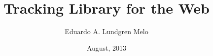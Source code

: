 \documentclass{ufpethesis}
\institute{Computer Science Center}
\title{Tracking Library for the Web}
\date{August, 2013}
\author{Eduardo A. Lundgren Melo}
\begin{document}
\frontmatter

\frontpage

\presentationpage
\end{document}
